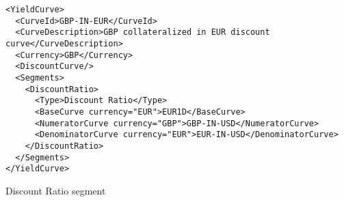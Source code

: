 \begin{listing}[H]
\begin{verbatim}
<YieldCurve>
  <CurveId>GBP-IN-EUR</CurveId>
  <CurveDescription>GBP collateralized in EUR discount curve</CurveDescription>
  <Currency>GBP</Currency>
  <DiscountCurve/>
  <Segments>
    <DiscountRatio>
      <Type>Discount Ratio</Type>
      <BaseCurve currency="EUR">EUR1D</BaseCurve>
      <NumeratorCurve currency="GBP">GBP-IN-USD</NumeratorCurve>
      <DenominatorCurve currency="EUR">EUR-IN-USD</DenominatorCurve>
    </DiscountRatio>
  </Segments>
</YieldCurve>
\end{verbatim}
\caption{Discount Ratio segment}
\label{lst:discount_ratio_segment}
\end{listing}


